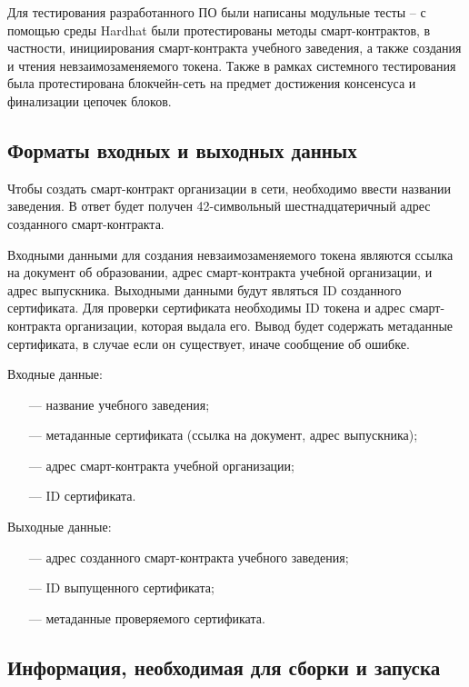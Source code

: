 Для тестирования разработанного ПО были написаны модульные тесты -- с помощью среды Hardhat \cite{hardhat} были протестированы методы смарт-контрактов, в частности, инициирования смарт-контракта учебного заведения, а также создания и чтения невзаимозаменяемого токена. Также в рамках системного тестирования была протестирована блокчейн-сеть на предмет достижения консенсуса и финализации цепочек блоков.




\subsection{Форматы входных и выходных данных}

Чтобы создать смарт-контракт организации в сети, необходимо ввести названии заведения. В ответ будет получен 42-символьный шестнадцатеричный адрес созданного смарт-контракта.

Входными данными для создания невзаимозаменяемого токена являются ссылка на документ об образовании, адрес смарт-контракта учебной организации, и адрес выпускника. Выходными данными будут являться ID созданного сертификата.
Для проверки сертификата необходимы ID токена и адрес смарт-контракта организации, которая выдала его. Вывод будет содержать метаданные сертификата, в случае если он существует, иначе сообщение об ошибке.


Входные данные:
\begin{itemize}[leftmargin=1.6\parindent]
	\item[---] название учебного заведения;
	\item[---] метаданные сертификата (ссылка на документ, адрес выпускника);
	\item[---] адрес смарт-контракта учебной организации;
	\item[---] ID сертификата.
\end{itemize}

Выходные данные:
\begin{itemize}[leftmargin=1.6\parindent]
	\item[---] адрес созданного смарт-контракта учебного заведения;
	\item[---] ID выпущенного сертификата;
	\item[---] метаданные проверяемого сертификата.
\end{itemize}




\subsection{Информация, необходимая для сборки и запуска}

